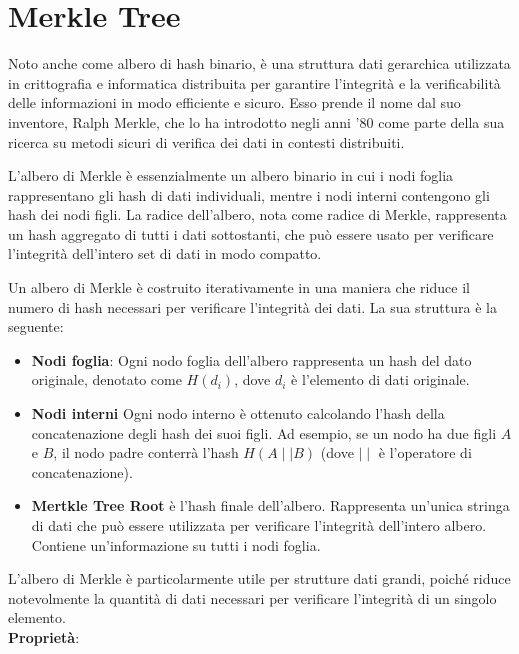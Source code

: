 \section{Merkle Tree}

\cite{merkle1987digital}
Noto anche come albero di hash binario, è una struttura dati gerarchica utilizzata in crittografia e informatica distribuita per garantire l'integrità e la verificabilità delle informazioni in modo efficiente e sicuro. Esso prende il nome dal suo inventore, Ralph Merkle, che lo ha introdotto negli anni '80 come parte della sua ricerca su metodi sicuri di verifica dei dati in contesti distribuiti.

L'albero di Merkle è essenzialmente un albero binario in cui i nodi foglia rappresentano gli hash di dati individuali, mentre i nodi interni contengono gli hash dei nodi figli. La radice dell'albero, nota come radice di Merkle, rappresenta un hash aggregato di tutti i dati sottostanti, che può essere usato per verificare l'integrità dell'intero set di dati in modo compatto.

Un albero di Merkle è costruito iterativamente in una maniera che riduce il numero di hash necessari per verificare l'integrità dei dati. La sua struttura è la seguente:

\begin{itemize}
    \item \textbf{Nodi foglia}: Ogni nodo foglia dell'albero rappresenta un hash del dato originale, denotato come $H(d_i)$, dove $d_i$ è l'elemento di dati originale.
    \item \textbf{Nodi interni} Ogni nodo interno è ottenuto calcolando l'hash della concatenazione degli hash dei suoi figli. Ad esempio, se un nodo ha due figli $A$ e $B$, il nodo padre conterrà l'hash $H(A\mid\mid B)$ (dove $\mid\mid$ è l'operatore di concatenazione).
    \item \textbf{Mertkle Tree Root} è l'hash finale dell'albero. Rappresenta un'unica stringa di dati che può essere utilizzata per verificare l'integrità dell'intero albero. Contiene un'informazione su tutti i nodi foglia.
\end{itemize}

L'albero di Merkle è particolarmente utile per strutture dati grandi, poiché riduce notevolmente la quantità di dati necessari per verificare l'integrità di un singolo elemento.\\

\textbf{Proprietà}:

